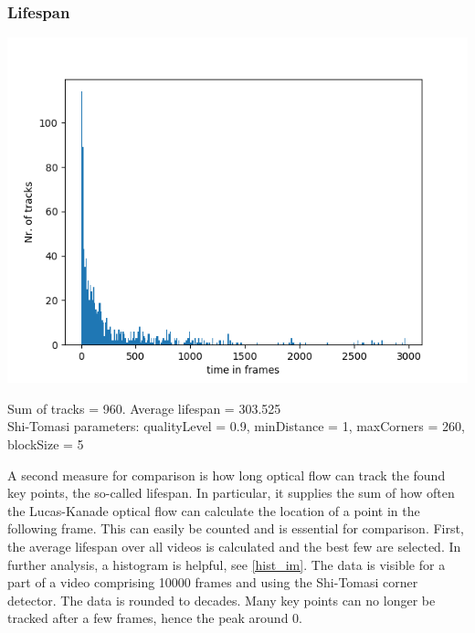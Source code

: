 \documentclass[Bachelorarbeit.tex]{subfiles}
\begin{document}
\subsubsection*{Lifespan}
\label{lifespan}
\begin{center}
	\includegraphics[width=0.7\linewidth]{Images/960_gfeat}
	
	Sum of tracks = 960. Average lifespan = 303.525 
	\\Shi-Tomasi parameters: qualityLevel = 0.9, minDistance = 1, maxCorners = 260, blockSize = 5
	\label{hist_im}
\end{center}
A second measure for comparison is how long optical flow can track the found key points, the so-called lifespan. In particular, it supplies the sum of how often the Lucas-Kanade optical flow can calculate the location of a point in the following frame. This can easily be counted and is essential for comparison. First, the average lifespan over all videos is calculated and the best few are selected. In further analysis, a histogram is helpful, see \autoref{hist_im}. The data is visible for a part of a video comprising 10000 frames and using the Shi-Tomasi corner detector. The data is rounded to decades. Many key points can no longer be tracked after a few frames, hence the peak around 0.
\end{document}
